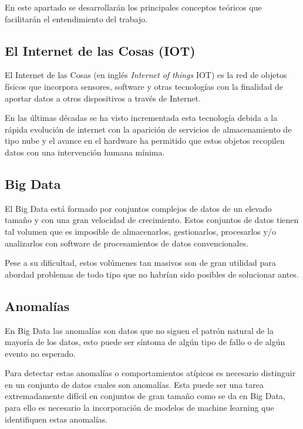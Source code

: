 
En este apartado se desarrollarán los principales conceptos teóricos que facilitarán el entendimiento del trabajo.

\subsection{El Internet de las Cosas (IOT)}
El Internet de las Cosas (en inglés \textit{Internet of things} IOT) es la red de objetos físicos que incorpora sensores, software y otras tecnologías con la finalidad de aportar datos a otros dispositivos a través de Internet.\cite{pagina:Oracle_IOT}

En las últimas décadas se ha visto incrementada esta tecnología debida a la rápida evolución de internet con la aparición de servicios de almacenamiento de tipo nube y el avance en el hardware ha permitido que estos objetos recopilen datos con una intervención humana mínima.


\subsection{Big Data}

El Big Data está formado por conjuntos complejos de datos de un elevado tamaño y con una gran velocidad de crecimiento. Estos conjuntos de datos tienen tal volumen que es imposible de almacenarlos, gestionarlos, procesarlos y/o analizarlos con software de procesamientos de datos convencionales.

Pese a su dificultad, estos volúmenes tan masivos son de gran utilidad para abordad problemas de todo tipo que no habrían sido posibles de solucionar antes. \cite{pagina:Oracle_big_data}

\subsection{Anomalías}

En Big Data las anomalías son datos que no siguen el patrón natural de la mayoría de los datos, esto puede ser síntoma de algún tipo de fallo o de algún evento no esperado. 

Para detectar estas anomalías o comportamientos atípicos es necesario distinguir en un conjunto de datos cuales son anomalías. Esta puede ser una tarea extremadamente difícil en conjuntos de gran tamaño como se da en Big Data, para ello es necesario la incorporación de modelos de machine learning que identifiquen estas anomalías.

